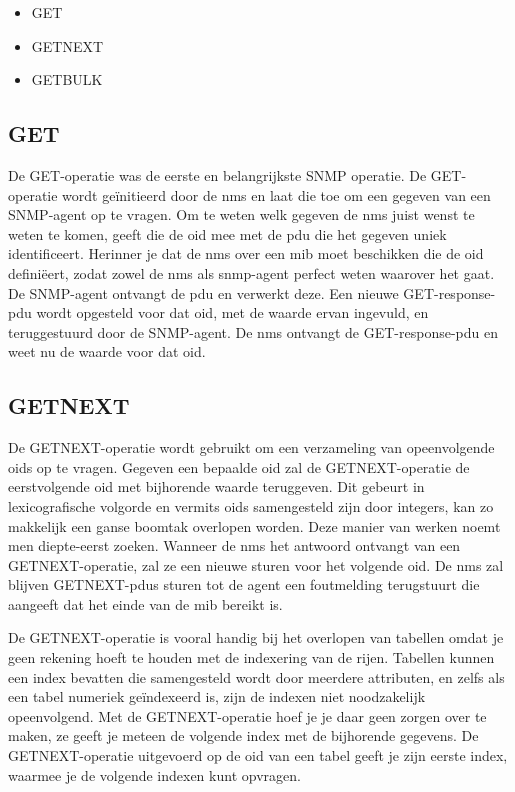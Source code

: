 	\begin{itemize}
		\item GET
		\item GETNEXT
		\item GETBULK
	\end{itemize}


\subsection{GET}
De GET-operatie was de eerste en belangrijkste SNMP operatie.
De GET-operatie wordt geïnitieerd door de \gls{nms} en laat die toe om een gegeven van een SNMP-agent op te vragen.
Om te weten welk gegeven de \gls{nms} juist wenst te weten te komen, geeft die de \gls{oid} mee met de \gls{pdu} die het gegeven uniek identificeert.
Herinner je dat de \gls{nms} over een \gls{mib} moet beschikken die de \gls{oid} definiëert, zodat zowel de \gls{nms} als \gls{snmp-agent} perfect weten waarover het gaat.
De SNMP-agent ontvangt de \gls{pdu} en verwerkt deze.
Een nieuwe GET-response-\gls{pdu} wordt opgesteld voor dat \gls{oid}, met de waarde ervan ingevuld,
en teruggestuurd door de SNMP-agent.
De \gls{nms} ontvangt de GET-response-\gls{pdu} en weet nu de waarde voor dat \gls{oid}.



\subsection{GETNEXT}
\label{snmp-getnext}
De GETNEXT-operatie wordt gebruikt om een verzameling van opeenvolgende \glspl{oid} op te vragen.
Gegeven een bepaalde \gls{oid} zal de GETNEXT-operatie de eerstvolgende \gls{oid} met bijhorende waarde teruggeven.
Dit gebeurt in lexicografische volgorde en vermits \glspl{oid} samengesteld zijn door integers, kan zo makkelijk een ganse boomtak overlopen worden.
Deze manier van werken noemt men diepte-eerst zoeken.\cite{essentialsnmp}
Wanneer de \gls{nms} het antwoord ontvangt van een GETNEXT-operatie, zal ze een nieuwe sturen voor het volgende \gls{oid}.
De \gls{nms} zal blijven GETNEXT-\glspl{pdu} sturen tot de agent een foutmelding terugstuurt die aangeeft dat het einde van de \gls{mib} bereikt is.

De GETNEXT-operatie is vooral handig bij het overlopen van tabellen omdat je geen rekening hoeft te houden met de indexering van de rijen.
Tabellen kunnen een index bevatten die samengesteld wordt door meerdere attributen,
en zelfs als een tabel numeriek geïndexeerd is, zijn de indexen niet noodzakelijk opeenvolgend.
Met de GETNEXT-operatie hoef je je daar geen zorgen over te maken, ze geeft je meteen de volgende index met de bijhorende gegevens.
De GETNEXT-operatie uitgevoerd op de \gls{oid} van een tabel geeft je zijn eerste index, waarmee je de volgende indexen kunt opvragen.

